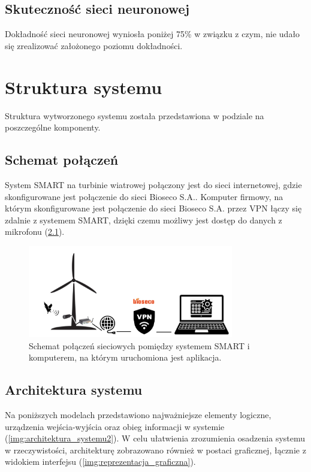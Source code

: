\documentclass{sprz}
\begin{document}
\section{Skuteczność sieci neuronowej}
Dokładność sieci neuronowej wyniosła poniżej 75\% w związku z czym, nie udało się zrealizować założonego poziomu dokładności.

\chapter{Struktura systemu}

Struktura wytworzonego systemu została przedstawiona w podziale na poszczególne komponenty.

\section{Schemat połączeń}
System SMART na turbinie wiatrowej połączony jest do sieci internetowej, gdzie skonfigurowane jest połączenie do sieci Bioseco S.A.. Komputer firmowy, na którym skonfigurowane jest połączenie do sieci Bioseco S.A. przez VPN łączy się zdalnie z systemem SMART, dzięki czemu możliwy jest dostęp do danych z mikrofonu (\ref{img:system-connection}).

\begin{figure}[h] 
  \centering
  \includegraphics[width=0.8\textwidth]{sprz/system-connection.png}
  \caption{Schemat połączeń sieciowych pomiędzy systemem SMART i komputerem, na którym uruchomiona jest aplikacja.}
  \label{img:system-connection}
\end{figure} 

\section{Architektura systemu}

Na poniższych modelach przedstawiono najważniejsze elementy logiczne, urządzenia wejścia-wyjścia oraz obieg informacji w systemie (\ref{img:architektura_systemu2}). W celu ułatwienia zrozumienia osadzenia systemu w rzeczywistości, architekturę zobrazowano również w postaci graficznej, łącznie z widokiem interfejsu (\ref{img:reprezentacja_graficzna}). 
\end{document}
